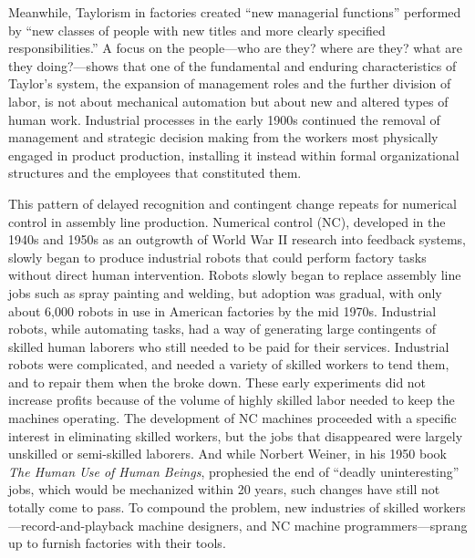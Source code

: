 Meanwhile, Taylorism in factories created ``new managerial
functions'' performed by ``new classes of people with new titles and
more clearly specified responsibilities.''\cite[p. 120]{aitken} A focus on the
people---who are they? where are they? what are they doing?---shows that
one of the fundamental and enduring characteristics of Taylor's
system, the expansion of management roles and the further division of
labor, is not about mechanical automation but about new and altered
types of human work. Industrial processes in the early 1900s continued
the removal of management and strategic decision making from the
workers most physically engaged in product production, installing it
instead within formal organizational structures and the employees that
constituted them. 

This pattern of delayed recognition and contingent change repeats for
numerical control in assembly line production. Numerical control (NC),
developed in the 1940s and 1950s as an outgrowth of World War II
research into feedback systems, slowly began to produce industrial
robots that could perform factory tasks without direct human
intervention. Robots slowly began to replace assembly line jobs such
as spray painting and welding, but adoption was gradual, with only
about 6,000 robots in use in American factories by the mid
1970s.\cite[p. 159]{nyeAmericas} Industrial robots, while automating tasks,
had a way of generating large contingents of skilled human laborers
who still needed to be paid for their services. Industrial robots were
complicated, and needed a variety of skilled workers to tend them, and
to repair them when the broke down. These early experiments did not
increase profits because of the volume of highly skilled labor needed
to keep the machines operating.\cite[p. 162]{nyeAmericas} The development of NC machines
proceeded with a specific interest in eliminating skilled workers, but
the jobs that disappeared were largely unskilled or semi-skilled
laborers.\cite[p. 164]{nyeAmericas} And while Norbert Weiner, in his 1950 book \emph{The Human Use of
Human Beings}, prophesied the end of ``deadly uninteresting'' jobs, which
would be mechanized within 20 years, such changes have still not
totally come to pass.\cite[p. 161]{nyeAmericas} To compound the problem, new industries of
skilled workers---record-and-playback machine designers, and NC machine
programmers---sprang up to furnish factories with their tools.

